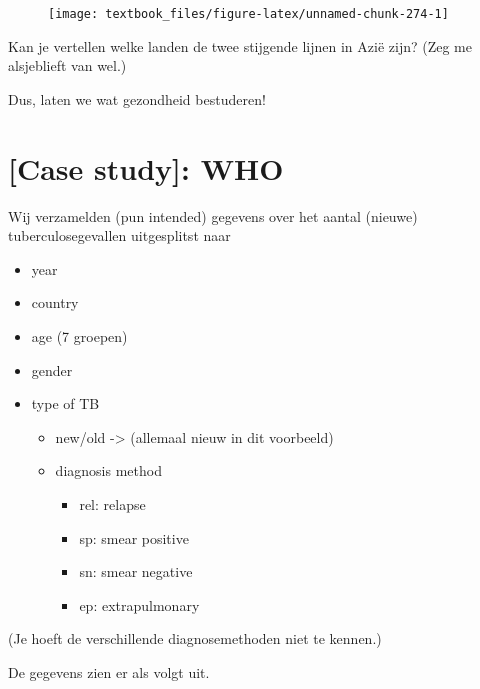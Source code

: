 \documentclass[]{tufte-book}
\newenvironment{Shaded}{}{}
\newcommand{\KeywordTok}[1]{\textcolor[rgb]{0.00,0.44,0.13}{\textbf{#1}}}
\newcommand{\NormalTok}[1]{#1}
\newcommand{\OperatorTok}[1]{\textcolor[rgb]{0.40,0.40,0.40}{#1}}
\newcommand{\StringTok}[1]{\textcolor[rgb]{0.25,0.44,0.63}{#1}}
\providecommand{\tightlist}{%
  \setlength{\itemsep}{0pt}\setlength{\parskip}{0pt}}
\begin{document}
\begin{figure}
\texttt{[image: textbook\_files/figure-latex/unnamed-chunk-274-1]} \end{figure}

Kan je vertellen welke landen de twee stijgende lijnen in Azië zijn? (Zeg me alsjeblieft van wel.)

Dus, laten we wat gezondheid bestuderen!

\hypertarget{case-study-who}{%
\section{{[}Case study{]}: WHO}\label{case-study-who}}

Wij verzamelden (pun intended) gegevens over het aantal (nieuwe) tuberculosegevallen uitgesplitst naar

\begin{itemize}
\tightlist
\item
  year
\item
  country
\item
  age (7 groepen)
\item
  gender
\item
  type of TB

  \begin{itemize}
  \tightlist
  \item
    new/old -\textgreater{} (allemaal nieuw in dit voorbeeld)
  \item
    diagnosis method

    \begin{itemize}
    \tightlist
    \item
      rel: relapse
    \item
      sp: smear positive
    \item
      sn: smear negative
    \item
      ep: extrapulmonary
    \end{itemize}
  \end{itemize}
\end{itemize}

(Je hoeft de verschillende diagnosemethoden niet te kennen.)

De gegevens zien er als volgt uit.

\begin{Shaded}
\end{Shaded}
\end{document}
